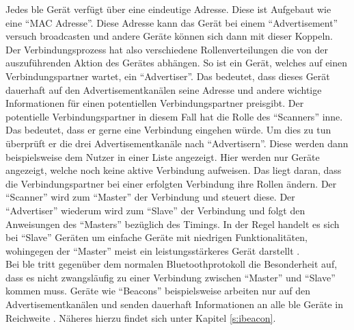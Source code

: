 \noindent Jedes \ac{ble} Gerät verfügt über eine eindeutige Adresse. Diese ist Aufgebaut wie eine "`MAC Adresse"'. Diese Adresse kann das Gerät bei einem "`Advertisement"' versuch broadcasten und andere Geräte können sich dann mit dieser Koppeln. Der Verbindungsprozess hat also verschiedene Rollenverteilungen die von der auszuführenden Aktion des Gerätes abhängen. So ist ein Gerät, welches auf einen Verbindungspartner wartet, ein "`Advertiser"'. Das bedeutet, dass dieses Gerät dauerhaft auf den Advertisementkanälen seine Adresse und andere wichtige Informationen für einen potentiellen Verbindungspartner preisgibt. Der potentielle Verbindungspartner in diesem Fall hat die Rolle des "`Scanners"' inne. Das bedeutet, dass er gerne eine Verbindung eingehen würde. Um dies zu tun überprüft er die drei Advertisementkanäle nach "`Advertisern"'. Diese werden dann beispielsweise dem Nutzer in einer Liste angezeigt. Hier werden nur Geräte angezeigt, welche noch keine aktive Verbindung aufweisen. Das liegt daran, dass die Verbindungspartner bei einer erfolgten Verbindung ihre Rollen ändern. Der "`Scanner"' wird zum "`Master"' der Verbindung und steuert diese. Der "`Advertiser"' wiederum wird zum "`Slave"' der Verbindung und folgt den Anweisungen des "`Masters"' bezüglich des Timings. In der Regel handelt es sich bei "`Slave"' Geräten um einfache Geräte mit niedrigen Funktionalitäten, wohingegen der "`Master"' meist ein leistungsstärkeres Gerät darstellt \cite[Seite 18f]{Townsend14:GSB}.\\  

\noindent Bei \ac{ble} tritt gegenüber dem normalen Bluetoothprotokoll die Besonderheit auf, dass es nicht zwangsläufig zu einer Verbindung zwischen "`Master"' und "`Slave"' kommen muss. Geräte wie "`Beacons"' beispielsweise arbeiten nur auf den Advertisementkanälen und senden dauerhaft Informationen an alle \ac{ble} Geräte in Reichweite \cite[Seite 13]{Gast14:BPA}. Näheres hierzu findet sich unter Kapitel \ref{s:ibeacon}.\\


